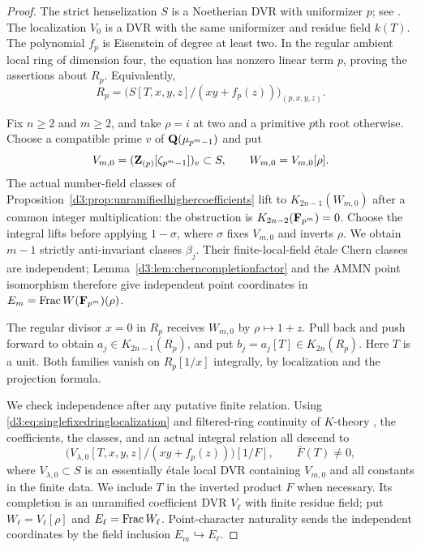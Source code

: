 \begin{proof}
The strict henselization $S$ is a Noetherian DVR with uniformizer
$p$; see \cite[Tags~06LJ and~0AP3]{StacksHenselization}.
The localization $V_0$ is a DVR with the same uniformizer and
residue field $k(T)$.
The polynomial $f_p$ is Eisenstein of degree at least two.
In the regular ambient local ring of dimension four, the equation
has nonzero linear term $p$, proving the assertions about $R_p$.
Equivalently,
\begin{equation}\label{d3:eq:singlefixedringlocalization}
 R_p=\bigl(S[T,x,y,z]/(xy+f_p(z))\bigr)_{(p,x,y,z)}.
\end{equation}

Fix $n\geq2$ and $m\geq2$, and take $\rho=i$ at two and a
primitive $p$th root otherwise.
Choose a compatible prime $v$ of $\mathbf Q(\mu_{p^m-1})$ and put
\[
 V_{m,0}=(\mathbf Z_{(p)}[\zeta_{p^m-1}])_v\subset S,
 \qquad W_{m,0}=V_{m,0}[\rho].
\]
The actual number-field classes of
Proposition~\ref{d3:prop:unramifiedhighercoefficients} lift to
$K_{2n-1}(W_{m,0})$ after a common integer multiplication:
the obstruction is $K_{2n-2}(\mathbf F_{p^m})=0$.
Choose the integral lifts before applying $1-\sigma$, where
$\sigma$ fixes $V_{m,0}$ and inverts $\rho$.
We obtain $m-1$ strictly anti-invariant classes $\beta_j$.
Their finite-local-field \'etale Chern classes are independent;
Lemma~\ref{d3:lem:cherncompletionfactor} and the AMMN point isomorphism
therefore give independent point coordinates in
$E_m=\operatorname{Frac} W(\mathbf F_{p^m})(\rho)$.

The regular divisor $x=0$ in $R_p$ receives $W_{m,0}$ by
$\rho\mapsto1+z$.
Pull back and push forward to obtain $a_j\in K_{2n-1}(R_p)$,
and put $b_j=a_j[T]\in K_{2n}(R_p)$.
Here $T$ is a unit. Both families vanish on $R_p[1/x]$
integrally, by localization and the projection formula.

We check independence after any putative finite relation.
Using \eqref{d3:eq:singlefixedringlocalization} and
filtered-ring continuity of $K$-theory
\cite[IV, Section~6.4]{Weibel}, the coefficients, the classes,
and an actual integral relation all descend to
\[
 \bigl(V_{\lambda,0}[T,x,y,z]/(xy+f_p(z))\bigr)[1/F],
 \qquad \bar F(T)\ne0,
\]
where $V_{\lambda,0}\subset S$ is an essentially \'etale local
DVR containing $V_{m,0}$ and all constants in the finite data.
We include $T$ in the inverted product $F$ when necessary.
Its completion is an unramified coefficient DVR $V_\ell$ with
finite residue field; put $W_\ell=V_\ell[\rho]$ and
$E_\ell=\operatorname{Frac} W_\ell$.
Point-character naturality sends the independent coordinates by
the field inclusion $E_m\hookrightarrow E_\ell$.


\end{proof}
